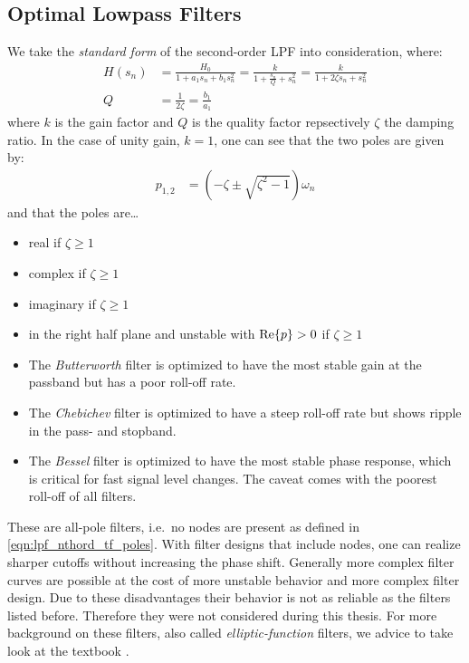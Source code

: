 \subsection{Optimal Lowpass Filters}
We take the \emph{standard form} of the second-order \ac{LPF} into consideration, where:
\begin{align}
  H(s_n) &= \frac{H_0}{1+a_1s_n+b_1s_n^2} = \frac{k}{\displaystyle 1+\frac{s_n}{Q}+s_n^2} = \frac{k}{1+2\zeta s_n+s_n^2} \\
  Q &= \frac{1}{2\zeta} = \frac{b_1}{a_1}
\end{align}
where $k$ is the gain factor and $Q$ is the quality factor repsectively $\zeta$ the damping ratio. In the case of unity gain, $k=1$, one can see that the two poles are given by:
\begin{align}
  p_{1,2} &= (-\zeta \pm \sqrt{\zeta^2-1})\omega_n
\end{align}
and that the poles are\dots
\begin{itemize}
  \item real if $\zeta\geq 1$
  \item complex if $\zeta\geq 1$
  \item imaginary if $\zeta\geq 1$
  \item in the right half plane and unstable with $\mathrm{Re}\Bqty{p}>0$ if $\zeta\geq 1$
\end{itemize}

\begin{itemize}
  \item The \emph{Butterworth} filter is optimized to have the most stable gain at the passband but has a poor roll-off rate.
  \item The \emph{Chebichev} filter is optimized to have a steep roll-off rate but shows ripple in the pass- and stopband.
  \item The \emph{Bessel} filter is optimized to have the most stable phase response, which is critical for fast signal level changes. The caveat comes with the poorest roll-off of all filters.
\end{itemize}
These are all-pole filters, i.e.\ no nodes are present as defined in \eqref{eqn:lpf_nthord_tf_poles}. With filter designs that include nodes, one can realize sharper cutoffs without increasing the phase shift. Generally more complex filter curves are possible at the cost of more unstable behavior and more complex filter design. Due to these disadvantages their behavior is not as reliable as the filters listed before. Therefore they were not considered during this thesis. For more background on these filters, also called \emph{elliptic-function} filters, we advice to take look at the textbook \cite{williams2014analog}.

